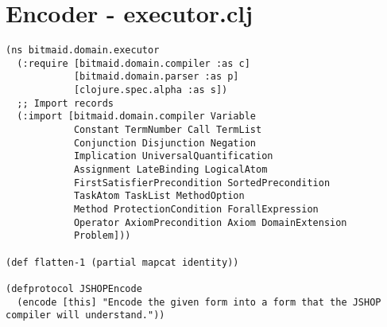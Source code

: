 \section{Encoder - executor.clj}
\begin{lstlisting}
(ns bitmaid.domain.executor
  (:require [bitmaid.domain.compiler :as c]
            [bitmaid.domain.parser :as p]
            [clojure.spec.alpha :as s])
  ;; Import records
  (:import [bitmaid.domain.compiler Variable
            Constant TermNumber Call TermList
            Conjunction Disjunction Negation
            Implication UniversalQuantification
            Assignment LateBinding LogicalAtom
            FirstSatisfierPrecondition SortedPrecondition
            TaskAtom TaskList MethodOption
            Method ProtectionCondition ForallExpression
            Operator AxiomPrecondition Axiom DomainExtension
            Problem]))

(def flatten-1 (partial mapcat identity))

(defprotocol JSHOPEncode
  (encode [this] "Encode the given form into a form that the JSHOP compiler will understand."))


\end{lstlisting}
